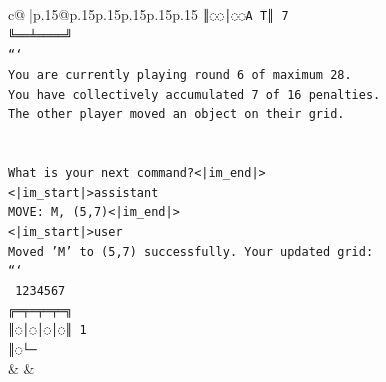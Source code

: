 \documentclass{article}
\begin{document}
{\begin{supertabular}{c@{$\;$}|p{.15\linewidth}@{}p{.15\linewidth}p{.15\linewidth}p{.15\linewidth}p{.15\linewidth}p{.15\linewidth}}
{{{\texttt{║◌◌│◌◌A T║ 7} \\
\texttt{╚══╧════╝} \\
\texttt{```} \\
\texttt{You are currently playing round 6 of maximum 28.} \\
\texttt{You have collectively accumulated 7 of 16 penalties.} \\
\texttt{The other player moved an object on their grid.} \\
\\ 
\\ 
\texttt{What is your next command?<|im\_end|>} \\
\texttt{<|im\_start|>assistant} \\
\texttt{MOVE: M, (5,7)<|im\_end|>} \\
\texttt{<|im\_start|>user} \\
\texttt{Moved 'M' to (5,7) successfully. Your updated grid:} \\
\texttt{```} \\
\texttt{ 1234567} \\
\texttt{╔═╤═╤═╤═╗} \\
\texttt{║◌│◌│◌│◌║ 1} \\
\texttt{║◌└─} \\
            }
        }
    }
    & & \\ \\


\end{supertabular}}
\end{document}
